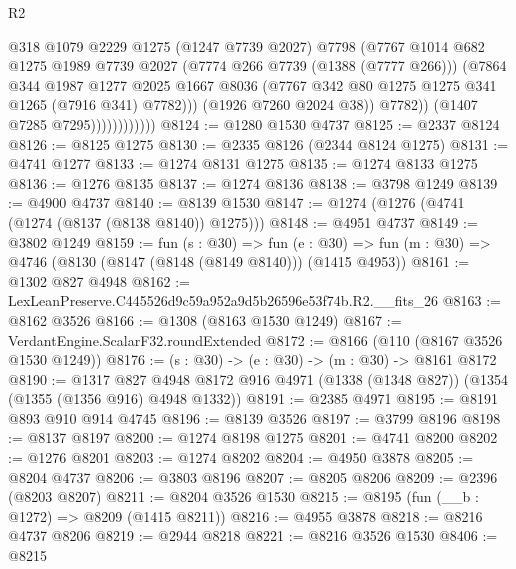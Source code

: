 \begin{lexlean}{R2}
\begin{coremodule}
                                @318
                                @1079
                                @2229
                                @1275
                                (@1247 @7739 @2027)
                                @7798
                                (@7767
                                  @1014
                                  @682
                                  @1275
                                  @1989
                                  @7739
                                  @2027
                                  (@7774 @266 @7739 (@1388 (@7777 @266)))
                                  (@7864
                                    @344
                                    @1987
                                    @1277
                                    @2025
                                    @1667
                                    @8036
                                    (@7767 @342 @80 @1275 @1275 @341 @1265 (@7916 @341) @7782)))
                                (@1926 @7260 @2024 @38))
                              @7782))
                          (@1407 @7285 @7295))))))))))))
@8124 := @1280 @1530 @4737
@8125 := @2337 @8124
@8126 := @8125 @1275
@8130 := @2335 @8126 (@2344 @8124 @1275)
@8131 := @4741 @1277
@8133 := @1274 @8131 @1275
@8135 := @1274 @8133 @1275
@8136 := @1276 @8135
@8137 := @1274 @8136
@8138 := @3798 @1249
@8139 := @4900 @4737
@8140 := @8139 @1530
@8147 := @1274 (@1276 (@4741 (@1274 (@8137 (@8138 @8140)) @1275)))
@8148 := @4951 @4737
@8149 := @3802 @1249
@8159 := fun (s : @30) =>
  fun (e : @30) => fun (m : @30) => @4746 (@8130 (@8147 (@8148 (@8149 @8140))) (@1415 @4953))
@8161 := @1302 @827 @4948
@8162 := LexLeanPreserve.C445526d9c59a952a9d5b26596e53f74b.R2.__fits_26
@8163 := @8162 @3526
@8166 := @1308 (@8163 @1530 @1249)
@8167 := VerdantEngine.ScalarF32.roundExtended
@8172 := @8166 (@110 (@8167 @3526 @1530 @1249))
@8176 := (s : @30) -> (e : @30) -> (m : @30) -> @8161 @8172
@8190 := @1317
    @827
    @4948
    @8172
    @916
    @4971
    (@1338 (@1348 @827))
    (@1354 (@1355 (@1356 @916) @4948 @1332))
@8191 := @2385 @4971
@8195 := @8191 @893 @910 @914 @4745
@8196 := @8139 @3526
@8197 := @3799 @8196
@8198 := @8137 @8197
@8200 := @1274 @8198 @1275
@8201 := @4741 @8200
@8202 := @1276 @8201
@8203 := @1274 @8202
@8204 := @4950 @3878
@8205 := @8204 @4737
@8206 := @3803 @8196
@8207 := @8205 @8206
@8209 := @2396 (@8203 @8207)
@8211 := @8204 @3526 @1530
@8215 := @8195 (fun (__b : @1272) => @8209 (@1415 @8211))
@8216 := @4955 @3878
@8218 := @8216 @4737 @8206
@8219 := @2944 @8218
@8221 := @8216 @3526 @1530
@8406 := @8215

\end{coremodule}
\end{lexlean}
